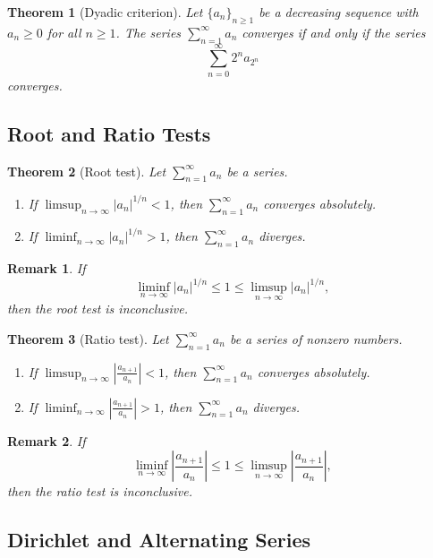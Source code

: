 \documentclass[12pt]{article}
\newtheorem*{remark}{Remark}
\newtheorem{theorem}{Theorem}
\begin{document}
\begin{theorem}[Dyadic criterion]
Let $\{a_n\}_{n\ge 1}$ be a decreasing sequence with $a_n\ge 0$ for all
$n\ge 1$. The series $\sum_{n=1}^{\infty} a_n$ converges if and only if the
series
\[
\sum_{n=0}^{\infty} 2^n a_{2^n}
\]
converges.
\end{theorem}

\subsection*{Root and Ratio Tests}

\begin{theorem}[Root test]
Let $\sum_{n=1}^{\infty} a_n$ be a series.
\begin{enumerate}[label=\textbf{(\arabic*)}]
\item If $\limsup_{n\to\infty} |a_n|^{1/n}<1$, then
      $\sum_{n=1}^{\infty} a_n$ converges absolutely.
\item If $\liminf_{n\to\infty} |a_n|^{1/n}>1$, then
      $\sum_{n=1}^{\infty} a_n$ diverges.
\end{enumerate}
\end{theorem}

\begin{remark}
If
\[
\liminf_{n\to\infty} |a_n|^{1/n}\le 1\le \limsup_{n\to\infty} |a_n|^{1/n},
\]
then the root test is inconclusive.
\end{remark}

\begin{theorem}[Ratio test]
Let $\sum_{n=1}^{\infty} a_n$ be a series of nonzero numbers.
\begin{enumerate}[label=\textbf{(\arabic*)}]
\item If $\limsup_{n\to\infty} \left| \frac{a_{n+1}}{a_n} \right|<1$, then
      $\sum_{n=1}^{\infty} a_n$ converges absolutely.
\item If $\liminf_{n\to\infty} \left| \frac{a_{n+1}}{a_n} \right|>1$, then
      $\sum_{n=1}^{\infty} a_n$ diverges.
\end{enumerate}
\end{theorem}

\begin{remark}
If
\[
\liminf_{n\to\infty} \left| \frac{a_{n+1}}{a_n} \right|\le 1
\le \limsup_{n\to\infty} \left| \frac{a_{n+1}}{a_n} \right|,
\]
then the ratio test is inconclusive.
\end{remark}

\subsection*{Dirichlet and Alternating Series}
\end{document}
